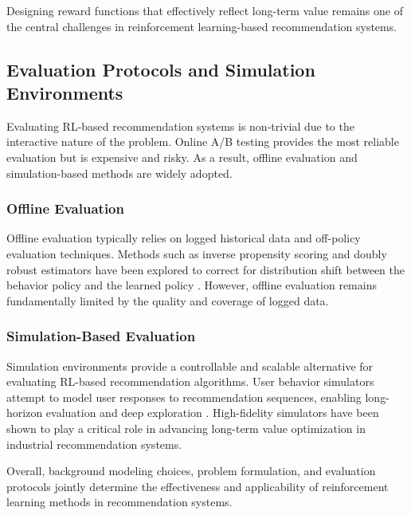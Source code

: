 Designing reward functions that effectively reflect long-term value remains one of the central challenges in reinforcement learning-based recommendation systems.

\subsection{Evaluation Protocols and Simulation Environments}

Evaluating RL-based recommendation systems is non-trivial due to the interactive nature of the problem. Online A/B testing provides the most reliable evaluation but is expensive and risky. As a result, offline evaluation and simulation-based methods are widely adopted.

\subsubsection{Offline Evaluation}

Offline evaluation typically relies on logged historical data and off-policy evaluation techniques. Methods such as inverse propensity scoring and doubly robust estimators have been explored to correct for distribution shift between the behavior policy and the learned policy \cite{Chen2019TopK}. However, offline evaluation remains fundamentally limited by the quality and coverage of logged data.

\subsubsection{Simulation-Based Evaluation}

Simulation environments provide a controllable and scalable alternative for evaluating RL-based recommendation algorithms. User behavior simulators attempt to model user responses to recommendation sequences, enabling long-horizon evaluation and deep exploration \cite{Ie2019DeepExploration}. High-fidelity simulators have been shown to play a critical role in advancing long-term value optimization in industrial recommendation systems.

Overall, background modeling choices, problem formulation, and evaluation protocols jointly determine the effectiveness and applicability of reinforcement learning methods in recommendation systems.
